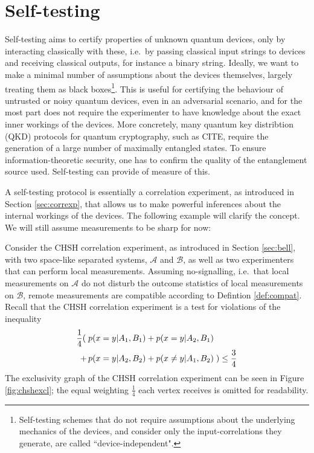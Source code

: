\chapter{Self-testing}
\label{sec:self-testing}

Self-testing aims to certify properties of unknown quantum devices, only by interacting classically with these, i.e.\ by passing classical input strings to devices and receiving classical outputs, for instance a binary string. Ideally, we want to make a minimal number of assumptions about the devices themselves, largely treating them as black boxes\footnote{Self-testing schemes that do not require assumptions about the underlying mechanics of the devices, and consider only the input-correlations they generate, are called ``device-independent".}. This is useful for certifying the behaviour of untrusted or noisy quantum devices, even in an adversarial scenario, and for the most part does not require the experimenter to have knowledge about the exact inner workings of the devices. 
More concretely, many quantum key distribtion (QKD) protocols for quantum cryptography, such as CITE, require the generation of a large number of maximally entangled states. To ensure information-theoretic security, one has to confirm the quality of the entanglement source used. Self-testing can provide of measure of this.

A self-testing protocol is essentially a correlation experiment, as introduced in Section \ref{sec:correxp}, that allows us to make powerful inferences about the internal workings of the devices. The following example will clarify the concept. We will still assume measurements to be sharp for now:

Consider the CHSH correlation experiment, as introduced in Section \ref{sec:bell}, with two space-like separated systems, $\mathcal{A}$ and $\mathcal{B}$, as well as two experimenters that can perform local measurements. Assuming no-signalling, i.e.\ that local measurements on $\mathcal{A}$ do not disturb the outcome statistics of local measurements on $\mathcal{B}$, remote measurements are compatible according to Defintion \ref{def:compat}. Recall that the CHSH correlation experiment is a test for violations of the inequality
\begin{align*}
    \frac{1}{4}(\; & p(x=y\vert A_1,B_1)+p(x=y\vert A_2,B_1)\\ +\thinspace&p(x=y\vert A_2,B_2)+p(x\neq y \vert A_1,B_2) \;)\leq \frac{3}{4}
\end{align*}
The exclusivity graph of the CHSH correlation experiment can be seen in Figure \ref{fig:chshexcl}; the equal weighting $\frac{1}{4}$ each vertex receives is omitted for readability. 

